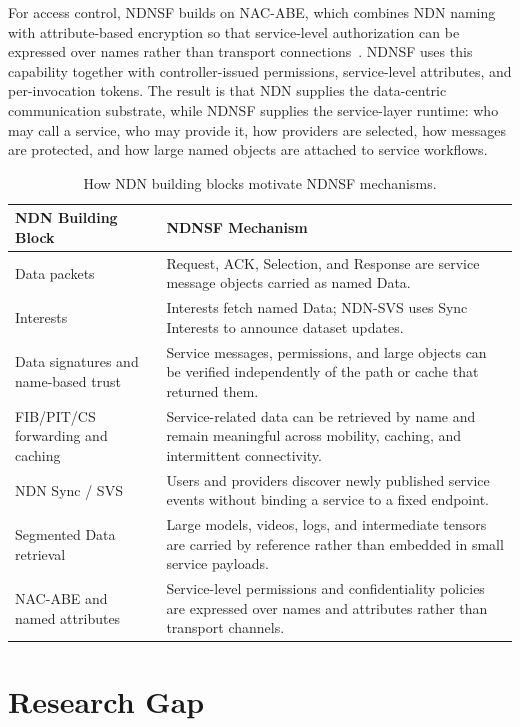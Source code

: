 For access control, NDNSF builds on NAC-ABE, which combines NDN naming with
attribute-based encryption so that service-level authorization can be expressed
over names rather than transport connections~\cite{dulal2023nacabe}. NDNSF uses this
capability together with controller-issued permissions, service-level
attributes, and per-invocation tokens. The result is that NDN supplies the
data-centric communication substrate, while NDNSF supplies the service-layer
runtime: who may call a service, who may provide it, how providers are
selected, how messages are protected, and how large named objects are attached
to service workflows.

\begin{table}[H]
\centering
\caption{How NDN building blocks motivate NDNSF mechanisms.}
\label{tab:ndn-to-ndnsf}
\begin{tabularx}{\textwidth}{p{}X}
\toprule
NDN Building Block & NDNSF Mechanism \\
\midrule
Data packets & Request, ACK, Selection, and Response are service message
objects carried as named Data. \\
Interests & Interests fetch named Data; NDN-SVS uses Sync Interests to
announce dataset updates. \\
Data signatures and name-based trust & Service messages, permissions, and
large objects can be verified independently of the path or cache that returned
them. \\
FIB/PIT/CS forwarding and caching & Service-related data can be retrieved by
name and remain meaningful across mobility, caching, and intermittent
connectivity. \\
NDN Sync / SVS & Users and providers discover newly published service events
without binding a service to a fixed endpoint. \\
Segmented Data retrieval & Large models, videos, logs, and intermediate
tensors are carried by reference rather than embedded in small service
payloads. \\
NAC-ABE and named attributes & Service-level permissions and confidentiality
policies are expressed over names and attributes rather than transport
channels. \\
\bottomrule
\end{tabularx}
\end{table}

\section{Research Gap}

